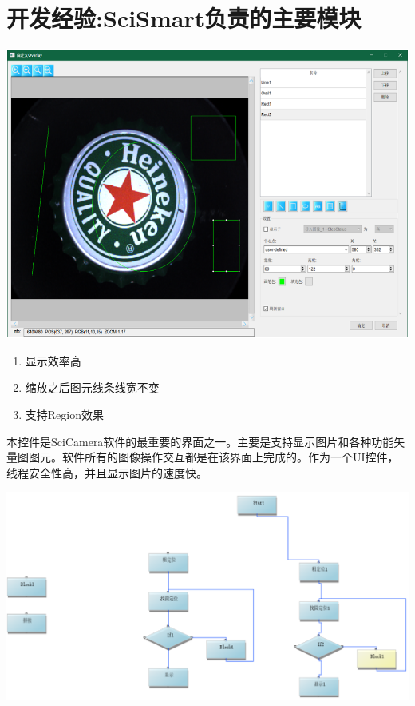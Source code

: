 \documentclass[lighthipster]{simplehipstercv}
\begin{document}
	\clearpage
	
	\begin{minipage}[t]{\textwidth}
		\section*{开发经验:SciSmart负责的主要模块}
		\begin{minipage}[t]{0.5\textwidth}
			\begin{flushleft}
				\includegraphics[width=0.8\linewidth]{PrjOPT_1.png}
				\begin{enumerate}
					\item 显示效率高
					\item 缩放之后图元线条线宽不变
					\item 支持Region效果
				\end{enumerate}
				本控件是SciCamera软件的最重要的界面之一。主要是支持显示图片和各种功能矢量图图元。软件所有的图像操作交互都是在该界面上完成的。作为一个UI控件，线程安全性高，并且显示图片的速度快。
			\end{flushleft}
		\end{minipage}
		\hspace*{1.6em}
		\begin{minipage}[t]{0.5\textwidth}
			\begin{flushleft}
				\includegraphics[width=0.8\linewidth]{PrjOPT_2.png}

\end{flushleft}
\end{minipage}
\end{minipage}
\end{document}
